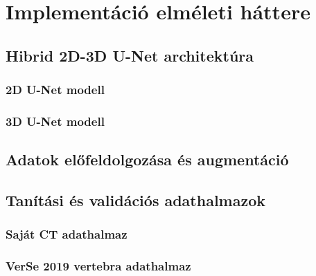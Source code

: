 \chapter{Implementáció elméleti háttere}  %

\section{Hibrid 2D-3D U-Net architektúra}  %

\subsection{2D U-Net modell}  %

\subsection{3D U-Net modell}  %

\section{Adatok előfeldolgozása és augmentáció}  %

\section{Tanítási és validációs adathalmazok}  %

\subsection{Saját CT adathalmaz}  %

\subsection{VerSe 2019 vertebra adathalmaz}  %
